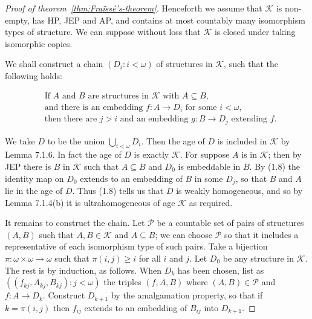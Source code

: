\begin{proof}[Proof of theorem~\ref{thm:Fraïssé’s-theorem}]
    Henceforth we assume that \(\mathcal{K}\) is non-empty, has HP, JEP and AP, and contains at most countably many isomorphism types of structure. We can suppose without loss that \(\mathcal{K}\) is closed under taking isomorphic copies.

    We shall construct a chain \((D_i : i < \omega)\) of structures in \(\mathcal{K}\), such that the following holds:

    \begin{equation}
        \tag{1.8}
        \begin{aligned}
             & \text{If } A \text{ and } B \text{ are structures in } \mathcal{K} \text{ with } A \subseteq B, \\
             & \text{and there is an embedding } f\colon A \to D_i \text{ for some } i < \omega,               \\
             & \text{then there are } j > i \text{ and an embedding } g\colon B \to D_j \text{ extending } f.
        \end{aligned}
    \end{equation}


    We take \(D\) to be the union \(\bigcup_{i<\omega} D_i\). Then the age of \(D\) is included in \(\mathcal{K}\) by Lemma 7.1.6. In fact the age of \(D\) is exactly \(\mathcal{K}\). For suppose \(A\) is in \(\mathcal{K}\); then by JEP there is \(B\) in \(\mathcal{K}\) such that \(A \subseteq B\) and \(D_0\) is embeddable in \(B\). By (1.8) the identity map on \(D_0\) extends to an embedding of \(B\) in some \(D_j\), so that \(B\) and \(A\) lie in the age of \(D\). Thus (1.8) tells us that \(D\) is weakly homogeneous, and so by Lemma 7.1.4(b) it is ultrahomogeneous of age \(\mathcal{K}\) as required.

    It remains to construct the chain. Let \(\mathcal{P}\) be a countable set of pairs of structures \((A, B)\) such that \(A, B \in \mathcal{K}\) and \(A \subseteq B\); we can choose \(\mathcal{P}\) so that it includes a representative of each isomorphism type of such pairs. Take a bijection \(\pi \colon \omega \times \omega \to \omega\) such that \(\pi(i, j) \geq i\) for all \(i\) and \(j\). Let \(D_0\) be any structure in \(\mathcal{K}\). The rest is by induction, as follows. When \(D_k\) has been chosen, list as \(((f_{kj}, A_{kj}, B_{kj}) : j < \omega)\) the triples \((f, A, B)\) where \((A, B) \in \mathcal{P}\) and \(f \colon A \to D_k\). Construct \(D_{k+1}\) by the amalgamation property, so that if \(k = \pi(i, j)\) then \(f_{ij}\) extends to an embedding of \(B_{ij}\) into \(D_{k+1}\).

\end{proof}


